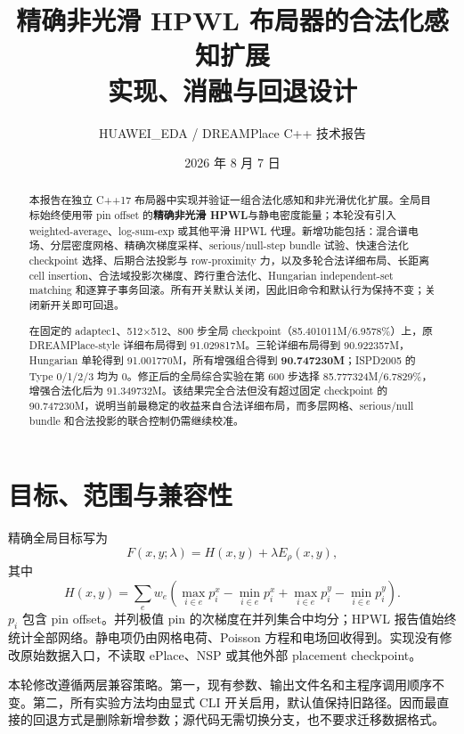\documentclass[11pt,a4paper]{ctexart}
\title{精确非光滑 HPWL 布局器的合法化感知扩展\\实现、消融与回退设计}
\author{HUAWEI\_EDA / DREAMPlace C++ 技术报告}
\date{2026 年 8 月 7 日}
\newcommand{\code}[1]{\texttt{\detokenize{#1}}}
\begin{document}
\maketitle

\begin{abstract}
本报告在独立 C++17 布局器中实现并验证一组合法化感知和非光滑优化扩展。全局目标始终使用带 pin offset 的\textbf{精确非光滑 HPWL}与静电密度能量；本轮没有引入 weighted-average、log-sum-exp 或其他平滑 HPWL 代理。新增功能包括：混合谱电场、分层密度网格、精确次梯度采样、serious/null-step bundle 试验、快速合法化 checkpoint 选择、后期合法投影与 row-proximity 力，以及多轮合法详细布局、长距离 cell insertion、合法域投影次梯度、跨行重合法化、Hungarian independent-set matching 和逐算子事务回滚。所有开关默认关闭，因此旧命令和默认行为保持不变；关闭新开关即可回退。

在固定的 adaptec1、512$\times$512、800 步全局 checkpoint（85.401011M/6.9578\%）上，原 DREAMPlace-style 详细布局得到 91.029817M。三轮详细布局得到 90.922357M，Hungarian 单轮得到 91.001770M，所有增强组合得到 \textbf{90.747230M}；ISPD2005 \code{legal2.pl} 的 Type 0/1/2/3 均为 0。修正后的全局综合实验在第 600 步选择 85.777324M/6.7829\%，增强合法化后为 91.349732M。该结果完全合法但没有超过固定 checkpoint 的 90.747230M，说明当前最稳定的收益来自合法详细布局，而多层网格、serious/null bundle 和合法投影的联合控制仍需继续校准。
\end{abstract}

\section{目标、范围与兼容性}

精确全局目标写为
\begin{equation}
  F(x,y;\lambda)=H(x,y)+\lambda E_\rho(x,y),
\end{equation}
其中
\begin{equation}
  H(x,y)=\sum_e w_e\left(
  \max_{i\in e}p_i^x-\min_{i\in e}p_i^x+
  \max_{i\in e}p_i^y-\min_{i\in e}p_i^y\right).
\end{equation}
$p_i$ 包含 pin offset。并列极值 pin 的次梯度在并列集合中均分；HPWL 报告值始终统计全部网络。静电项仍由网格电荷、Poisson 方程和电场回收得到。实现没有修改原始数据入口，不读取 ePlace、NSP 或其他外部 placement checkpoint。

本轮修改遵循两层兼容策略。第一，现有参数、输出文件名和主程序调用顺序不变。第二，所有实验方法均由显式 CLI 开关启用，默认值保持旧路径。因而最直接的回退方式是删除新增参数；源代码无需切换分支，也不要求迁移数据格式。
\end{document}
